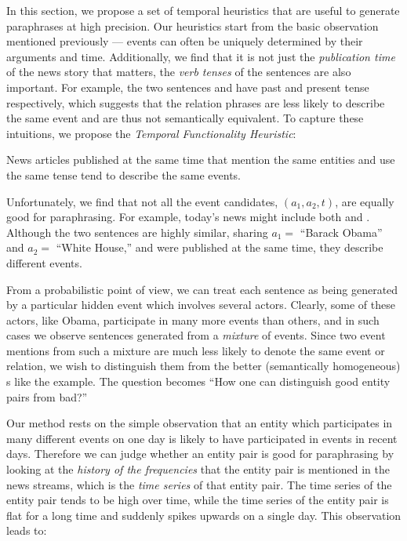 In this section, we propose a set of temporal heuristics that are
useful to generate paraphrases at high precision. Our heuristics start
from the basic observation mentioned previously --- events can often
be uniquely determined by their arguments and time.  Additionally, we
find that it is not just the {\em publication time} of the news story
that matters, the {\em verb tenses} of the sentences are also
important. For example, the two sentences  and  have past and present tense respectively, which
suggests that the relation phrases are less likely to describe the
same event and are thus not semantically equivalent. To capture these
intuitions, we propose the {\em Temporal Functionality Heuristic}:

\begin{H1}
	\label{hypo_one}
        News articles published at the same time that mention the
        same entities and use the same tense tend to describe the
        same events.
\end{H1}


Unfortunately, we find that not all the event candidates,
$(a_1,a_2,t)$, are equally good for paraphrasing. For example, today's
news might include both  and . Although the two sentences are highly similar, sharing
$a_1 = $ ``Barack Obama'' and $a_2 = $ ``White House,'' and were
published at the same time, they describe different events.

From a probabilistic point of view, we can treat each sentence as
being generated by a particular hidden event which involves several
actors.  Clearly, some of these actors, like Obama, participate in
many more events than others, and in such cases we observe sentences
generated from a {\em mixture} of events.  Since two event mentions
from such a mixture are much less likely to denote the same event or
relation, we wish to distinguish them from the better (semantically
homogeneous) \eec s like the 
example. The question becomes ``How one can distinguish good entity
pairs from bad?''

Our method rests on the simple observation that an entity which
participates in many different events on one day is likely to have
participated in events in recent days. Therefore we can judge whether
an entity pair is good for paraphrasing by looking at the {\em
  history of the frequencies} that the entity pair is mentioned in the
news streams, which is the {\em time series} of that entity pair. The
time series of the entity pair 
tends to be high over time, while the time series of the entity pair
 is flat for a long time and suddenly
spikes upwards on a single day. This observation leads to:

